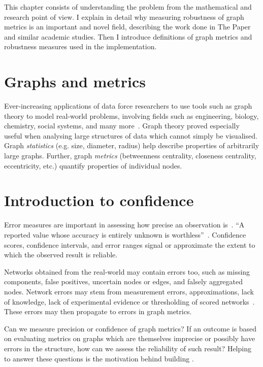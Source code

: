 This chapter consists of understanding the problem from the mathematical and research point of view.
I explain in detail why measuring robustness of graph metrics is an important and novel field, describing the work done in The Paper and similar academic studies.
Then I introduce definitions of graph metrics and robustness measures used in the implementation.


\section{Graphs and metrics}

Ever-increasing applications of data force researchers to use tools such as graph theory to model real-world problems, involving fields such as engineering, biology, chemistry, social systems, and many more~\cite{FouldsGraphTheoryApplications2012}.
Graph theory proved especially useful when analysing large structures of data which cannot simply be visualised.
Graph \textsl{statistics} (e.g. size, diameter, radius) help describe properties of arbitrarily large graphs.
Further, graph \textsl{metrics} (betweenness centrality, closeness centrality, eccentricity, etc.) quantify properties of individual nodes.


\section{Introduction to confidence}

Error measures are important in assessing how precise an observation is~\cite{Curran-EverettExplorationsStatisticsStandard2008}.
\enquote{A reported value whose accuracy is entirely unknown is worthless}~\cite{EisenhartExpressionUncertaintiesFinal1968}.
Confidence scores, confidence intervals, and error ranges signal or approximate the extent to which the observed result is reliable.

Networks obtained from the real-world may contain errors too, such as missing components, false positives, uncertain nodes or edges, and falsely aggregated nodes.
Network errors may stem from measurement errors, approximations, lack of knowledge, lack of experimental evidence or thresholding of scored networks~\cite{Wang2012,MarsdenNetworkDataMeasurement1990,JonesChallengesLimitationsQuantifying2010}.
These errors may then propagate to errors in graph metrics.

Can we measure precision or confidence of graph metrics?
If an outcome is based on evaluating metrics on graphs which are themselves imprecise or possibly have errors in the structure, how can we assess the reliability of such result?
Helping to answer these questions is the motivation behind building \graffs.

